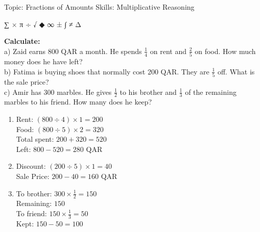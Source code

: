 \documentclass[
  letterpaper,
  DIV=11,
  numbers=noendperiod]{scrreprt}
\theoremstyle{definition}
\theoremstyle{remark}
\begin{document}
{Topic: Fractions of Amounts} {Skills: Multiplicative Reasoning}

∑ × π ÷ √ ◆ ∞ ± ∫ ≠ Δ

\begin{tcolorbox}[enhanced jigsaw, opacitybacktitle=0.6, coltitle=black, arc=.35mm, colframe=quarto-callout-important-color-frame, colback=white, bottomrule=.15mm, left=2mm, colbacktitle=quarto-callout-important-color!10!white, titlerule=0mm, opacityback=0, title={Level 2: Applied Context}, leftrule=.75mm, breakable, rightrule=.15mm, bottomtitle=1mm, toptitle=1mm, toprule=.15mm]

\textbf{Calculate:}\\
a) Zaid earns 800 QAR a month. He spends \(\frac{1}{4}\) on rent and
\(\frac{2}{5}\) on food. How much money does he have left?\\
b) Fatima is buying shoes that normally cost 200 QAR. They are
\(\frac{1}{5}\) off. What is the sale price?\\
c) Amir has 300 marbles. He gives \(\frac{1}{2}\) to his brother and
\(\frac{1}{3}\) of the remaining marbles to his friend. How many does he
keep?

\end{tcolorbox}

\begin{tcolorbox}[enhanced jigsaw, opacitybacktitle=0.6, coltitle=black, arc=.35mm, colframe=quarto-callout-tip-color-frame, colback=white, bottomrule=.15mm, left=2mm, colbacktitle=quarto-callout-tip-color!10!white, titlerule=0mm, opacityback=0, title=\textcolor{quarto-callout-tip-color}{\faLightbulb}\hspace{0.5em}{🔍 Solutions}, leftrule=.75mm, breakable, rightrule=.15mm, bottomtitle=1mm, toptitle=1mm, toprule=.15mm]

\begin{enumerate}
\def\labelenumi{\alph{enumi})}
\item
  Rent: \((800 \div 4) \times 1 = 200\)\\
  Food: \((800 \div 5) \times 2 = 320\)\\
  Total spent: \(200 + 320 = 520\)\\
  Left: \(800 - 520 = 280\) QAR
\item
  Discount: \((200 \div 5) \times 1 = 40\)\\
  Sale Price: \(200 - 40 = 160\) QAR
\item
  To brother: \(300 \times \frac{1}{2} = 150\)\\
  Remaining: \(150\)\\
  To friend: \(150 \times \frac{1}{3} = 50\)\\
  Kept: \(150 - 50 = 100\)
\end{enumerate}

\end{tcolorbox}
\end{document}
